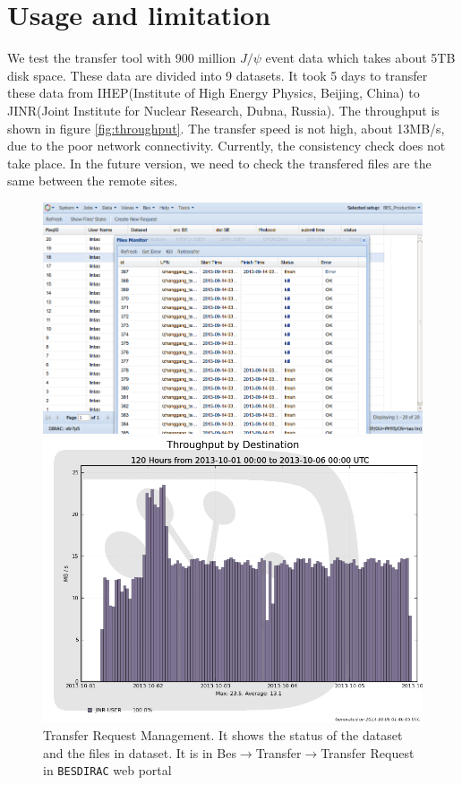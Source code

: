 \section{Usage and limitation}
We test the transfer tool with 900 million $J/\psi$ event data 
which takes about 5TB disk space. 
These data are divided into 9 datasets.
It took 5 days to transfer 
these data from IHEP(Institute of High Energy Physics, Beijing, China) 
to JINR(Joint Institute for Nuclear Research, Dubna, Russia). 
The throughput is shown in figure \ref{fig:throughput}.
The transfer speed is not high, about 13MB/s,
due to the poor network connectivity.
Currently, the consistency check does not take place.
In the future version, we need to check the transfered files 
are the same between the remote sites.
\begin{figure}[h]
\begin{minipage}{.49\textwidth}
\includegraphics[width=.95\textwidth, keepaspectratio]{data/transreqlist-with-kill-retransfer.png}
\caption{\label{fig:ui}Transfer Request Management.
It shows the status of the dataset and the files in dataset.
It is in Bes$\to$Transfer$\to$Transfer Request in {\tt BESDIRAC}
web portal}
\end{minipage}
\hspace{.02\textwidth}
\begin{minipage}{.49\textwidth}
\includegraphics[width=.95\textwidth, keepaspectratio]{data/throughput-dest-1001-10-06.png}

\end{minipage}
\end{figure}
